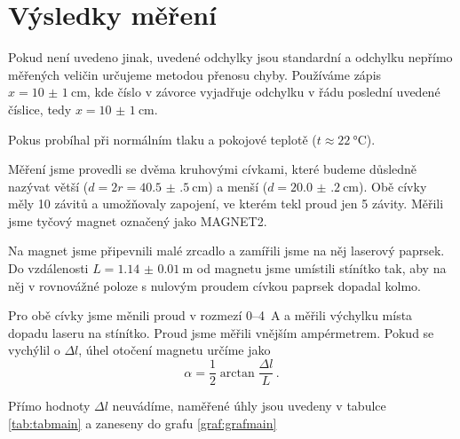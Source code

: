 \section*{Výsledky měření}

Pokud není uvedeno jinak, uvedené odchylky jsou standardní a odchylku nepřímo měřených veličin určujeme metodou přenosu chyby.
Používáme zápis $x=\SI{10(1)}{\cm}$, kde číslo v závorce vyjadřuje odchylku v řádu poslední uvedené číslice, tedy $x=\SI[separate-uncertainty=true]{10(1)}{\cm}$.


Pokus probíhal při normálním tlaku a pokojové teplotě ($t\approx\SI{22}{\degreeCelsius}$).

Měření jsme provedli se dvěma kruhovými cívkami, které budeme důsledně nazývat větší ($d=2r=\SI{40.5(5)}{\cm}$) a menší ($d=\SI{20.0(2)}{\cm}$).
Obě cívky měly 10 závitů a umožňovaly zapojení, ve kterém tekl proud jen 5 závity.
Měřili jsme tyčový magnet označený jako MAGNET2.

Na magnet jsme připevnili malé zrcadlo a zamířili jsme na něj laserový paprsek.
Do vzdálenosti $L=\SI{1.14(1)}{\m}$ od magnetu jsme umístili stínítko tak, aby na něj v rovnovážné poloze s nulovým proudem cívkou paprsek dopadal kolmo.

Pro obě cívky jsme měnili proud v rozmezí 0--\SI{4}{\ampere} a měřili výchylku místa dopadu laseru na stínítko. Proud jsme měřili vnějším ampérmetrem.
Pokud se vychýlil o $\Delta l$, úhel otočení magnetu určíme jako
\begin{equation}
\alpha = \frac{1}{2} \arctan \frac{\Delta l}{L} \,.
\end{equation}

Přímo hodnoty $\Delta l$ neuvádíme, naměřené úhly jsou uvedeny v tabulce \ref{tab:tabmain} a zaneseny do grafu \ref{graf:grafmain}


